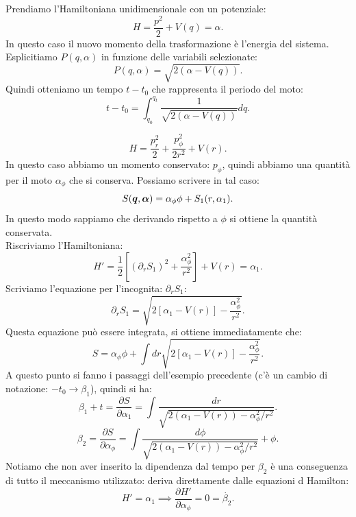 \noindent
\begin{exmp}
    Prendiamo l'Hamiltoniana unidimensionale con un potenziale:
    \[
	H = \frac{p^2}{2} + V(q) = \alpha
    .\] 
    In questo caso il nuovo momento della trasformazione è l'energia del sistema.\\
    Esplicitiamo $P(q,\alpha)$ in funzione delle variabili selezionate:
    \[
	P(q,\alpha) = \sqrt{2(\alpha-V(q))} 
    .\] 
    Quindi otteniamo un tempo $t-t_0$ che rappresenta il periodo del moto:
    \[
	t-t_0 = \int_{q_0}^{q_t} \frac{1}{\sqrt{2(\alpha-V(q))}}dq 
    .\] 
\end{exmp}
\noindent
\begin{exmp}
    \[
	H = \frac{p^2_r}{2} + \frac{p_\phi^2}{2r^2} + V(r) 
    .\] 
    In questo caso abbiamo un momento conservato: $p_\phi$, quindi abbiamo una quantità per il moto $\alpha_\phi$ che si conserva. Possiamo scrivere in tal caso:
    \[
	S(\boldsymbol{q}, \boldsymbol{\alpha}) = \alpha_\phi\phi  + S_1(r, \alpha_1) 
    .\] 
    In questo modo sappiamo che derivando rispetto a $\phi$  si ottiene la quantità conservata.\\
    Riscriviamo l'Hamiltoniana:
    \[
	H' = \frac{1}{2}\left[(\partial_{r}S_1)^2 + \frac{\alpha_\phi^2}{r^2}\right] + V(r) = \alpha_1
    .\] 
    Scriviamo l'equazione per l'incognita: $\partial_{r}S_1$:
    \[
	\partial_{r}S_1 = \sqrt{2\left[\alpha_1 - V(r) \right]- \frac{\alpha_\phi^2}{r^2}} 
    .\] 
    Questa equazione può essere integrata, si ottiene immediatamente che:
    \[
        S = \alpha_\phi\phi  + \int dr \sqrt{2\left[\alpha_1 - V(r) \right]- \frac{\alpha_\phi^2}{r^2}} 
    .\] 
    A questo punto si fanno i passaggi dell'esempio precedente (c'è un cambio di notazione: $-t_0\to \beta_1$), quindi si ha:
    \[
	\beta_1 + t = \frac{\partial S}{\partial \alpha_1} = \int  \frac{dr}{\sqrt{2(\alpha_1-V(r))- \alpha^2_\phi  /r^2}}
    .\] 
    \[
	\beta_2 = \frac{\partial S}{\partial \alpha_\phi} = \int  \frac{d\phi}{\sqrt{2(\alpha_1-V(r))- \alpha^2_\phi  /r^2}} + \phi
    .\] 
    Notiamo che non aver inserito la dipendenza dal tempo per $\beta_2$ è una conseguenza di tutto il meccanismo utilizzato: deriva direttamente dalle equazioni d Hamilton:
    \[
        H' = \alpha_1 \implies  \frac{\partial H'}{\partial \alpha_\phi} = 0 = \dot{\beta_2}
    .\] 
\end{exmp}
\noindent
